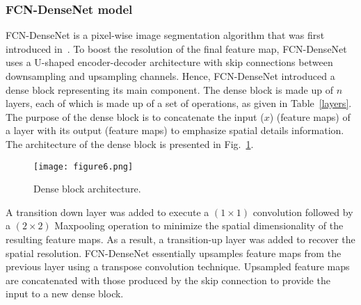 \subsubsection{FCN-DenseNet model}
FCN-DenseNet is a pixel-wise image segmentation algorithm that was first introduced in~\cite{Jegou}.
To boost the resolution of the final feature map, FCN-DenseNet uses a U-shaped encoder-decoder architecture with skip connections between downsampling and upsampling channels.
Hence, FCN-DenseNet introduced a dense block representing its main component.
The dense block is made up of \(n\) layers, each of which is made up of a set of operations, as given in Table~\ref{layers}.
The purpose of the dense block is to concatenate the input (\(x\)) (feature maps) of a layer with its output (feature maps) to emphasize spatial details information.
The architecture of the dense block is presented in Fig.~\ref{dense_block}. 
\begin{figure} [h!]
	\begin{center}
		\texttt{[image: figure6.png]}
	\end{center}
	\caption{Dense block architecture.} 
	\label{dense_block}
\end{figure}

A transition down layer was added to execute a \((1\times 1)\) convolution followed by a \((2\times 2)\) Maxpooling operation to minimize the spatial dimensionality of the resulting feature maps.
As a result, a transition-up layer was added to recover the spatial resolution.
FCN-DenseNet essentially upsamples feature maps from the previous layer using a transpose convolution technique.
Upsampled feature maps are concatenated with those produced by the skip connection to provide the input to a new dense block.

